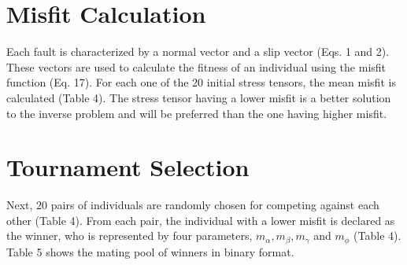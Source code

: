 \section{Misfit Calculation}
Each fault is characterized by a normal vector and a slip vector (Eqs. 1 and 2). These vectors are used to calculate the fitness of an individual using the misfit function (Eq. 17). For each one of the 20 initial stress tensors, the mean misfit is calculated (Table 4). The stress tensor having a lower misfit is a better solution to the inverse problem and will be preferred than the one having higher misfit.

\section{Tournament Selection}
Next, 20 pairs of individuals are randomly chosen for competing against each other (Table 4). From each pair, the individual with a lower misfit is declared as the winner, who is represented by four parameters, $m_{\alpha}, m_{\beta}, m_{\gamma}$ and $m_{\phi}$ (Table 4). Table 5 shows the mating pool of winners in binary format.

\pagebreak


